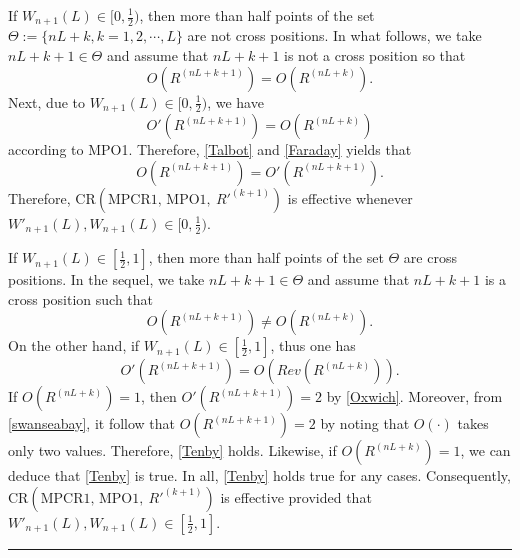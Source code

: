 \documentclass[11pt]{article}
\newcommand{\fin}{\hspace*{\fill}\rule{0.3em}{1ex}}
\newenvironment{proof}{{\bf \noindent Proof.}}{\fin}
\numberwithin{equation}{section}
\begin{document}
\begin{proof}
If $W_{n+1}(L)\in[0,\frac{1}{2})$, then more than half  points of the set $\Theta:=\{nL+k,k=1,2,\cdots, L\}$ are not cross positions. In what follows, we take $nL+k+1\in \Theta$ and assume that $nL+k+1$ is not a cross position so that 
\begin{equation}\label{Talbot}
O(R^{(nL+k+1)})=O(R^{(nL+k)}).
\end{equation}
Next, due to $W_{n+1}(L)\in[0,\frac{1}{2})$, we have 
\begin{equation}\label{Faraday}
O'(R^{(nL+k+1)})=O(R^{(nL+k)}) 
\end{equation}
according to MPO1. Therefore, \eqref{Talbot} and \eqref{Faraday} yields that 
\begin{equation} \label{Tenby}
O(R^{(nL+k+1)})=O'(R^{(nL+k+1)}).
\end{equation}
Therefore, CR$(\mbox{MPCR1,  MPO1},~  R'^{(k+1)})$ is effective whenever  $W'_{n+1}(L), W_{n+1}(L)\in [0,\frac{1}{2})$.

If $W_{n+1}(L)\in[\frac{1}{2},1]$, then more than half  points of the set $\Theta$  are cross positions. In the sequel, we take 
$nL+k+1\in \Theta$ and assume that $nL+k+1$ is   a cross position such that 
\begin{equation}\label{swanseabay}
O(R^{(nL+k+1)})\neq O(R^{(nL+k)}).
\end{equation}
On the other hand, if $W_{n+1}(L)\in[\frac{1}{2},1]$, thus one has 
\begin{equation}\label{Oxwich}
O'(R^{(nL+k+1)})=O(Rev(R^{(nL+k)})).
\end{equation}
If $O(R^{(nL+k)})=1$, then $O'(R^{(nL+k+1)})=2$ by \eqref{Oxwich}. Moreover, from \eqref{swanseabay}, it follow that $O(R^{(nL+k+1)})=2$ by noting that $O(\cdot)$ takes only two values. Therefore,   \eqref{Tenby} holds. 
 Likewise, if  $O(R^{(nL+k)})=1$, we can deduce that \eqref{Tenby} is true. In all, \eqref{Tenby}  holds true for any cases. Consequently, CR$(\mbox{MPCR1,  MPO1},~  R'^{(k+1)})$ is effective provided that $W'_{n+1}(L), W_{n+1}(L)\in [\frac{1}{2},1]$.  
 

\end{proof}
\end{document}
